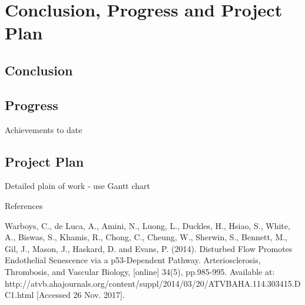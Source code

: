 
\chapter{Conclusion, Progress and Project Plan} %

\label{Chapter5} %

\section{Conclusion}

\section{Progress}

Achievements to date

\section{Project Plan}

Detailed plain of work - use Gantt chart

References

Warboys, C., de Luca, A., Amini, N., Luong, L., Duckles, H., Hsiao, S., White, A., Biswas, S., Khamis, R., Chong, C., Cheung, W., Sherwin, S., Bennett, M., Gil, J., Mason, J., Haskard, D. and Evans, P. (2014). Disturbed Flow Promotes Endothelial Senescence via a p53-Dependent Pathway. Arteriosclerosis, Thrombosis, and Vascular Biology, [online] 34(5), pp.985-995. Available at: http://atvb.ahajournals.org/content/suppl/2014/03/20/ATVBAHA.114.303415.DC1.html [Accessed 26 Nov. 2017].
